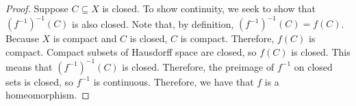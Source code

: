 \begin{framed}
\begin{proof}
        Suppose $C\subseteq X$ is closed. To show continuity, we seek to show that $(f^{-1})^{-1}(C)$ is also closed. Note that, by definition, $(f^{-1})^{-1}(C) = f(C)$. Because $X$ is compact and $C$ is closed, $C$ is compact. Therefore, $f(C)$ is compact. Compact subsets of Hausdorff space are closed, so $f(C)$ is closed. This means that $(f^{-1})^{-1}(C)$ is closed. Therefore, the preimage of $f^{-1}$ on closed sets is closed, so $f^{-1}$ is continuous. Therefore, we have that $f$ is a homeomorphism. 
    \end{proof}
\end{framed}
